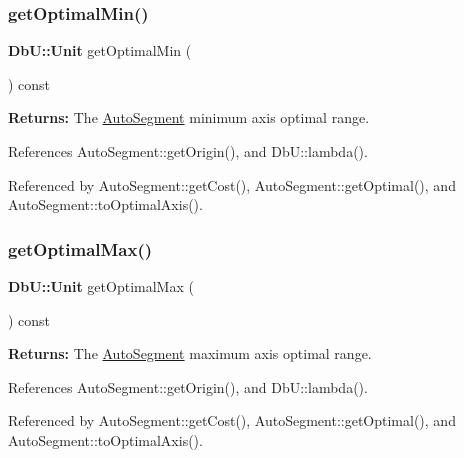 \subsubsection{\texorpdfstring{get\+Optimal\+Min()}{getOptimalMin()}}
{\footnotesize\ttfamily \textbf{ Db\+U\+::\+Unit} get\+Optimal\+Min (\begin{DoxyParamCaption}{ }\end{DoxyParamCaption}) const\hspace{0.3cm}{\ttfamily [inline]}}

{\bfseries Returns\+:} The \mbox{\hyperlink{classKatabatic_1_1AutoSegment}{Auto\+Segment}} minimum axis optimal range. 

References Auto\+Segment\+::get\+Origin(), and Db\+U\+::lambda().



Referenced by Auto\+Segment\+::get\+Cost(), Auto\+Segment\+::get\+Optimal(), and Auto\+Segment\+::to\+Optimal\+Axis().

\mbox{\label{classKatabatic_1_1AutoSegment_a1bada13dd4460386d4bed22c1a4b3921}} 
\subsubsection{\texorpdfstring{get\+Optimal\+Max()}{getOptimalMax()}}
{\footnotesize\ttfamily \textbf{ Db\+U\+::\+Unit} get\+Optimal\+Max (\begin{DoxyParamCaption}{ }\end{DoxyParamCaption}) const\hspace{0.3cm}{\ttfamily [inline]}}

{\bfseries Returns\+:} The \mbox{\hyperlink{classKatabatic_1_1AutoSegment}{Auto\+Segment}} maximum axis optimal range. 

References Auto\+Segment\+::get\+Origin(), and Db\+U\+::lambda().



Referenced by Auto\+Segment\+::get\+Cost(), Auto\+Segment\+::get\+Optimal(), and Auto\+Segment\+::to\+Optimal\+Axis().

\mbox{\label{classKatabatic_1_1AutoSegment_a110201bd7c64ed78522cfb3f7b142431}} 
